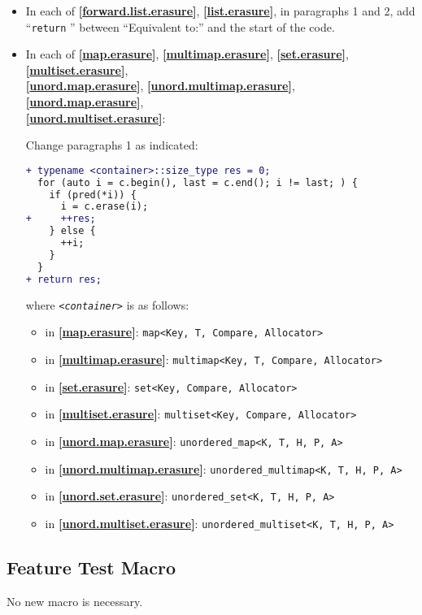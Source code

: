 \documentclass[11pt]{article}
\newcommand{\wgpaper}[1]{\href{https://wg21.link/#1}{#1}}
\newcommand{\isref}[1]{\textbf{[\wgpaper{#1}]}}
\begin{document}
\begin{itemize}
\item In each of \isref{forward.list.erasure}, \isref{list.erasure},
  in paragraphs 1 and 2, add ``\texttt{return} '' between ``Equivalent
  to:'' and the start of the code.

\item In each of  \isref{map.erasure},
  \isref{multimap.erasure}, \isref{set.erasure},
  \isref{multiset.erasure},\\ \isref{unord.map.erasure},
  \isref{unord.multi\-map.erasure}, \isref{unord.map.erasure},\\
  \isref{unord.multiset.erasure}:
  
  Change paragraphs 1 as indicated:

\begin{lstlisting}[language=diff]
+ typename <container>::size_type res = 0;
  for (auto i = c.begin(), last = c.end(); i != last; ) {
    if (pred(*i)) {
      i = c.erase(i);
+     ++res;
    } else {
      ++i;
    }
  }
+ return res;
\end{lstlisting}

where \texttt{\textit{<container>}} is as follows:
\begin{itemize}
\item in \isref{map.erasure}: \texttt{map<Key, T, Compare, Allocator>}
\item in \isref{multimap.erasure}: \texttt{multimap<Key, T, Compare, Allocator>}
\item in \isref{set.erasure}: \texttt{set<Key, Compare, Allocator>}
\item in \isref{multiset.erasure}: \texttt{multiset<Key, Compare, Allocator>}
\item in \isref{unord.map.erasure}: \texttt{unordered\_map<K, T, H, P, A>}
\item in \isref{unord.multimap.erasure}: \texttt{unordered\_multimap<K, T, H, P, A>}
\item in \isref{unord.set.erasure}: \texttt{unordered\_set<K, T, H, P, A>}
\item in \isref{unord.multiset.erasure}: \texttt{unordered\_multiset<K, T, H, P, A>}
\end{itemize}
\end{itemize}

\subsection{Feature Test Macro}

No new macro is necessary.
\end{document}
